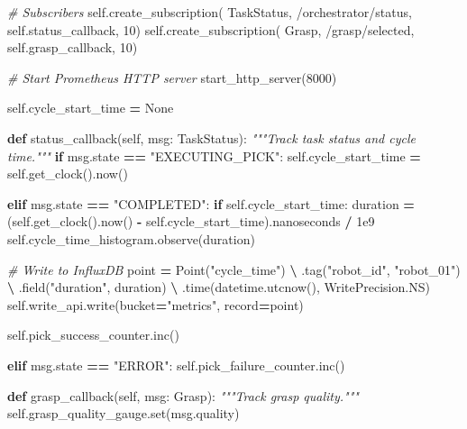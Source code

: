 \documentclass[
]{article}
\newenvironment{Shaded}{\begin{snugshade}}{\end{snugshade}}
\newcommand{\BuiltInTok}[1]{#1}
\newcommand{\CommentTok}[1]{\textcolor[rgb]{0.56,0.35,0.01}{\textit{#1}}}
\newcommand{\ControlFlowTok}[1]{\textcolor[rgb]{0.13,0.29,0.53}{\textbf{#1}}}
\newcommand{\DecValTok}[1]{\textcolor[rgb]{0.00,0.00,0.81}{#1}}
\newcommand{\FloatTok}[1]{\textcolor[rgb]{0.00,0.00,0.81}{#1}}
\newcommand{\KeywordTok}[1]{\textcolor[rgb]{0.13,0.29,0.53}{\textbf{#1}}}
\newcommand{\NormalTok}[1]{#1}
\newcommand{\OperatorTok}[1]{\textcolor[rgb]{0.81,0.36,0.00}{\textbf{#1}}}
\newcommand{\StringTok}[1]{\textcolor[rgb]{0.31,0.60,0.02}{#1}}
\newcommand{\VariableTok}[1]{\textcolor[rgb]{0.00,0.00,0.00}{#1}}
\begin{document}
\begin{Shaded}
\begin{Highlighting}[]
        \CommentTok{\# Subscribers}
        \VariableTok{self}\NormalTok{.create\_subscription(}
\NormalTok{            TaskStatus, }\StringTok{\textquotesingle{}/orchestrator/status\textquotesingle{}}\NormalTok{, }\VariableTok{self}\NormalTok{.status\_callback, }\DecValTok{10}\NormalTok{)}
        \VariableTok{self}\NormalTok{.create\_subscription(}
\NormalTok{            Grasp, }\StringTok{\textquotesingle{}/grasp/selected\textquotesingle{}}\NormalTok{, }\VariableTok{self}\NormalTok{.grasp\_callback, }\DecValTok{10}\NormalTok{)}

        \CommentTok{\# Start Prometheus HTTP server}
\NormalTok{        start\_http\_server(}\DecValTok{8000}\NormalTok{)}

        \VariableTok{self}\NormalTok{.cycle\_start\_time }\OperatorTok{=} \VariableTok{None}

    \KeywordTok{def}\NormalTok{ status\_callback(}\VariableTok{self}\NormalTok{, msg: TaskStatus):}
        \CommentTok{"""Track task status and cycle time."""}
        \ControlFlowTok{if}\NormalTok{ msg.state }\OperatorTok{==} \StringTok{"EXECUTING\_PICK"}\NormalTok{:}
            \VariableTok{self}\NormalTok{.cycle\_start\_time }\OperatorTok{=} \VariableTok{self}\NormalTok{.get\_clock().now()}

        \ControlFlowTok{elif}\NormalTok{ msg.state }\OperatorTok{==} \StringTok{"COMPLETED"}\NormalTok{:}
            \ControlFlowTok{if} \VariableTok{self}\NormalTok{.cycle\_start\_time:}
\NormalTok{                duration }\OperatorTok{=}\NormalTok{ (}\VariableTok{self}\NormalTok{.get\_clock().now() }\OperatorTok{{-}} \VariableTok{self}\NormalTok{.cycle\_start\_time).nanoseconds }\OperatorTok{/} \FloatTok{1e9}
                \VariableTok{self}\NormalTok{.cycle\_time\_histogram.observe(duration)}

                \CommentTok{\# Write to InfluxDB}
\NormalTok{                point }\OperatorTok{=}\NormalTok{ Point(}\StringTok{"cycle\_time"}\NormalTok{) }\OperatorTok{\textbackslash{}}
\NormalTok{                    .tag(}\StringTok{"robot\_id"}\NormalTok{, }\StringTok{"robot\_01"}\NormalTok{) }\OperatorTok{\textbackslash{}}
\NormalTok{                    .field(}\StringTok{"duration"}\NormalTok{, duration) }\OperatorTok{\textbackslash{}}
\NormalTok{                    .time(datetime.utcnow(), WritePrecision.NS)}
                \VariableTok{self}\NormalTok{.write\_api.write(bucket}\OperatorTok{=}\StringTok{"metrics"}\NormalTok{, record}\OperatorTok{=}\NormalTok{point)}

            \VariableTok{self}\NormalTok{.pick\_success\_counter.inc()}

        \ControlFlowTok{elif}\NormalTok{ msg.state }\OperatorTok{==} \StringTok{"ERROR"}\NormalTok{:}
            \VariableTok{self}\NormalTok{.pick\_failure\_counter.inc()}

    \KeywordTok{def}\NormalTok{ grasp\_callback(}\VariableTok{self}\NormalTok{, msg: Grasp):}
        \CommentTok{"""Track grasp quality."""}
        \VariableTok{self}\NormalTok{.grasp\_quality\_gauge.}\BuiltInTok{set}\NormalTok{(msg.quality)}
\end{Highlighting}
\end{Shaded}
\end{document}
